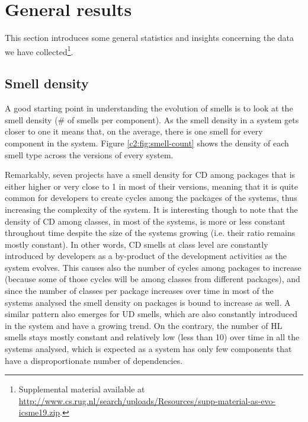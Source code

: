 \section{General results}\label{c2:sec:general-results}
This section introduces some general statistics and insights concerning the data we have collected\footnote{\label{fn:supp-mat}Supplemental material available at \url{http://www.cs.rug.nl/search/uploads/Resources/supp-material-as-evo-icsme19.zip}.}.

\subsection{Smell density}
A good starting point in understanding the evolution of smells is to look at the smell density (\# of smells per component).
As the smell density in a system gets closer to one it means that, on the average,  there is one smell for every component in the system.
Figure \ref{c2:fig:smell-count} shows the density of each smell type across the versions of every system. 

Remarkably, seven projects have a smell density for CD among packages that is either higher or very close to 1 in most of their versions, meaning that it is quite common for developers to create cycles among the packages of the systems, thus increasing the complexity of the system.
It is interesting though to note that the density of CD among classes, in most of the systems, is more or less constant throughout time despite the size of the systems growing (i.e. their ratio remains mostly constant).
In other words, CD smells at class level are constantly introduced by developers as a by-product of the development activities as the system evolves.
This causes also the number of cycles among packages to increase (because some of those cycles will be among classes from different packages), and since the number of classes per package increases over time in most of the systems analysed the smell density on packages is bound to increase as well.
A similar pattern also emerges for UD smells, which are also constantly introduced in the system and have a growing trend.
On the contrary, the number of HL smells stays mostly constant and relatively low (less than 10) over time in all the systems analysed, which is expected as a system has only few components that have a disproportionate number of dependencies.

\vspace{1mm}

